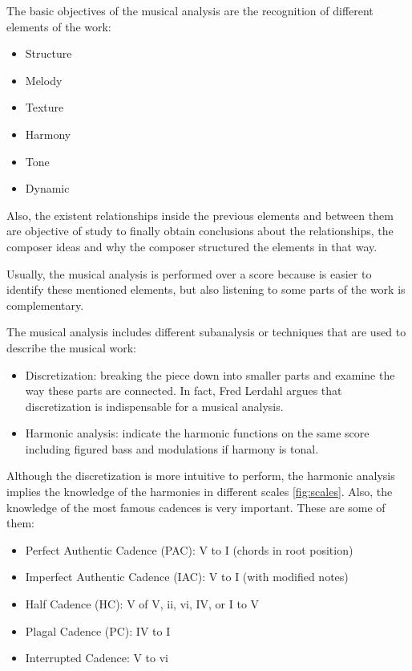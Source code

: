 \documentclass[a4paper,openany,oneside,12pt]{book}
\begin{document}
The basic objectives of the musical analysis are the recognition of different elements of the work:

\begin{itemize}
\item Structure
\item Melody
\item Texture
\item Harmony
\item Tone
\item Dynamic
\end{itemize}

Also, the existent relationships inside the previous elements and between them are objective of study to finally obtain conclusions about the relationships, the composer ideas and why the composer structured the elements in that way.

Usually, the musical analysis is performed over a score because is easier to identify these mentioned elements, but also listening to some parts of the work is complementary.

The musical analysis includes different subanalysis or techniques that are used to describe the musical work:

\begin{itemize}
\item Discretization: breaking the piece down into smaller parts and examine the way these parts are connected. In fact, Fred Lerdahl\cite{Lerdahl} argues that discretization is indispensable for a musical analysis.
\item Harmonic analysis: indicate the harmonic functions on the same score including figured bass and modulations if harmony is tonal.
\end{itemize}

Although the discretization is more intuitive to perform, the harmonic analysis implies the knowledge of the harmonies in different scales \ref{fig:scales}. Also, the knowledge of the most famous cadences is very important. These are some of them:

\begin{itemize}
\item Perfect Authentic Cadence (PAC): V to I (chords in root position)
\item Imperfect Authentic Cadence (IAC): V to I (with modified notes)
\item Half Cadence (HC): V of V, ii, vi, IV, or I to V
\item Plagal Cadence (PC): IV to I
\item Interrupted Cadence: V to vi
\end{itemize}
\end{document}
